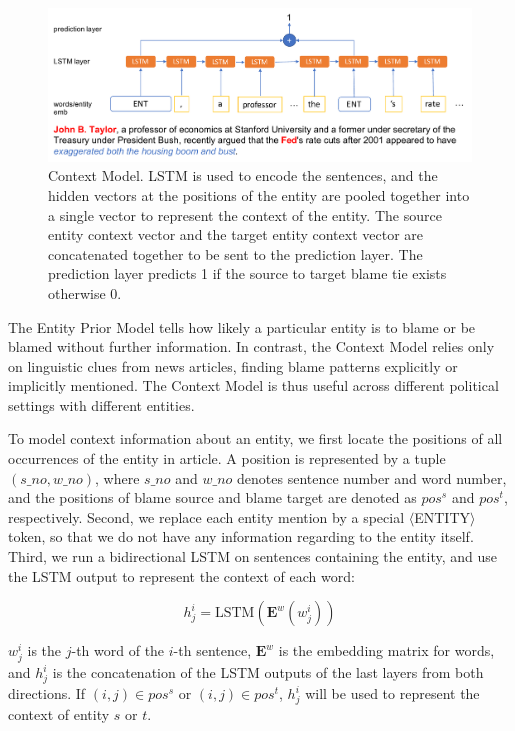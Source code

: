 \documentclass[letterpaper]{article}
\begin{document}
\begin{figure}[!tp] 
  \centering 
  \includegraphics[width=5.5in]{contextmodel.pdf}
  \caption{Context Model. LSTM is used to encode the sentences, and the hidden vectors at the positions of the entity are pooled together into a single vector to represent the context of the entity. The source entity context vector and the target entity context vector are concatenated together to be sent to the prediction layer. The prediction layer predicts 1 if the source to target blame tie exists otherwise 0.}
  \label{figure:contextmodel}
\end{figure}

The Entity Prior Model tells how likely a particular entity is to blame or be blamed without further information. In contrast, the Context Model relies only on linguistic clues from news articles, finding blame patterns explicitly or implicitly mentioned. The Context Model is thus useful across different political settings with different entities.

To model context information about an entity, we first locate the positions of all occurrences of the entity in article. A position is represented by a tuple $(s\_no, w\_no)$, where $s\_no$ and $w\_no$ denotes sentence number and word number, and the positions of blame source and blame target are denoted as $pos^s$ and $pos^t$, respectively. Second, we replace each entity mention by a special $\langle$ENTITY$\rangle$ token, so that we do not have any information regarding to the entity itself. Third, we run a bidirectional LSTM on sentences containing the entity, and use the LSTM output to represent the context of each word:

$$h^i_j=\mathrm{LSTM}(\mathbf{E}^w(w^i_j))$$

$w^i_j$ is the $j$-th word of the $i$-th sentence, $\mathbf{E}^w$ is the embedding matrix for words, and $h^i_j$ is the concatenation of the LSTM outputs of the last layers from both directions. If $(i, j) \in pos^s$ or $(i, j) \in pos^t$, $h^i_j$ will be used to represent the context of entity $s$ or $t$.
\end{document}
